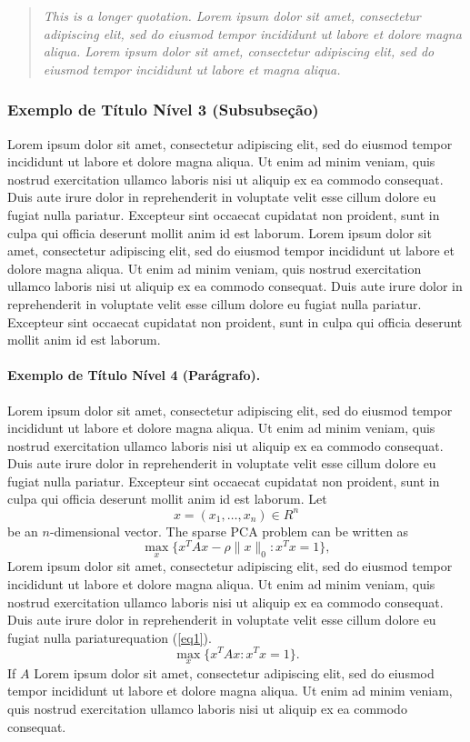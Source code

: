 \documentclass[portuguese]{sbc2025}%
\begin{document}
\begin{quotation}
\textit{This is a longer quotation. Lorem ipsum dolor sit amet, consectetur adipiscing elit, sed do eiusmod tempor incididunt ut labore et dolore magna aliqua. Lorem ipsum dolor sit amet, consectetur adipiscing elit, sed do eiusmod tempor incididunt ut labore et magna aliqua. 
}\end{quotation} 

\subsubsection{Exemplo de Título Nível 3 (Subsubseção)}

Lorem ipsum dolor sit amet, consectetur adipiscing elit, sed do eiusmod tempor incididunt ut labore et dolore magna aliqua. Ut enim ad minim veniam, quis nostrud exercitation ullamco laboris nisi ut aliquip ex ea commodo consequat. Duis aute irure dolor in reprehenderit in voluptate velit esse cillum dolore eu fugiat nulla pariatur. Excepteur sint occaecat cupidatat non proident, sunt in culpa qui officia deserunt mollit anim id est laborum. Lorem ipsum dolor sit amet, consectetur adipiscing elit, sed do eiusmod tempor incididunt ut labore et dolore magna aliqua. Ut enim ad minim veniam, quis nostrud exercitation ullamco laboris nisi ut aliquip ex ea commodo consequat. Duis aute irure dolor in reprehenderit in voluptate velit esse cillum dolore eu fugiat nulla pariatur. Excepteur sint occaecat cupidatat non proident, sunt in culpa qui officia deserunt mollit anim id est laborum.

\paragraph{Exemplo de Título Nível 4 (Parágrafo).}

Lorem ipsum dolor sit amet, consectetur adipiscing elit, sed do eiusmod tempor incididunt ut labore et dolore magna aliqua. Ut enim ad minim veniam, quis nostrud exercitation ullamco laboris nisi ut aliquip ex ea commodo consequat. Duis aute irure dolor in reprehenderit in voluptate velit esse cillum dolore eu fugiat nulla pariatur. Excepteur sint occaecat cupidatat non proident, sunt in culpa qui officia deserunt mollit anim id est laborum. 
Let
\[
x=(x_1,\dots,x_n)\in R^n
\]be an \(n\)-dimensional vector. The sparse PCA problem can be written as
\begin{equation}\label{eq1}
\max\limits_{x}\{x^TAx-\rho\|x\|_0:x^Tx=1\},
\end{equation}
Lorem ipsum dolor sit amet, consectetur adipiscing elit, sed do eiusmod tempor incididunt ut labore et dolore magna aliqua. Ut enim ad minim veniam, quis nostrud exercitation ullamco laboris nisi ut aliquip ex ea commodo consequat. Duis aute irure dolor in reprehenderit in voluptate velit esse cillum dolore eu fugiat nulla pariatur\break equation (\ref{eq1}). 
\[\max\limits_{x}\{x^TAx :x^Tx=1\}.\]
If $A$ Lorem ipsum dolor sit amet, consectetur adipiscing elit, sed do eiusmod tempor incididunt ut labore et dolore magna aliqua. Ut enim ad minim veniam, quis nostrud exercitation ullamco laboris nisi ut aliquip ex ea commodo consequat. 
\end{document}
